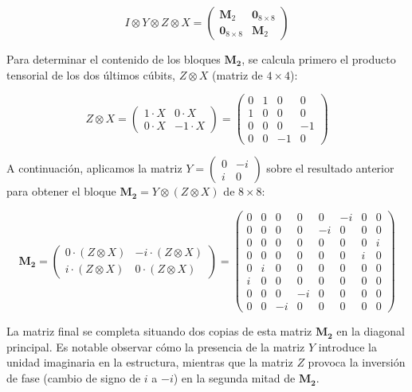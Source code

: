 \documentclass[11pt,a4paper,spanish]{book}
\begin{document}
\[
I \otimes Y \otimes Z \otimes X = 
\begin{pmatrix}
\mathbf{M}_2 & \mathbf{0}_{8 \times 8} \\
\mathbf{0}_{8 \times 8} & \mathbf{M}_2
\end{pmatrix}
\]

Para determinar el contenido de los bloques $\mathbf{M_2}$, se calcula primero el producto tensorial de los dos últimos cúbits, $Z \otimes X$ (matriz de $4 \times 4$):

\[
Z \otimes X = 
\begin{pmatrix} 1 \cdot X & 0 \cdot X \\ 0 \cdot X & -1 \cdot X \end{pmatrix} =
\begin{pmatrix}
0 & 1 & 0 & 0 \\
1 & 0 & 0 & 0 \\
0 & 0 & 0 & -1 \\
0 & 0 & -1 & 0
\end{pmatrix}
\]

A continuación, aplicamos la matriz $Y = \begin{pmatrix} 0 & -i \\ i & 0 \end{pmatrix}$ sobre el resultado anterior para obtener el bloque $\mathbf{M_2} = Y \otimes (Z \otimes X)$ de $8 \times 8$:

\[
\mathbf{M_2} = 
\begin{pmatrix} 
0 \cdot (Z \otimes X) & -i \cdot (Z \otimes X) \\ 
i \cdot (Z \otimes X) & 0 \cdot (Z \otimes X) 
\end{pmatrix} =
\begin{pmatrix}
0 & 0 & 0 & 0 & 0 & -i & 0 & 0 \\
0 & 0 & 0 & 0 & -i & 0 & 0 & 0 \\
0 & 0 & 0 & 0 & 0 & 0 & 0 & i \\
0 & 0 & 0 & 0 & 0 & 0 & i & 0 \\
0 & i & 0 & 0 & 0 & 0 & 0 & 0 \\
i & 0 & 0 & 0 & 0 & 0 & 0 & 0 \\
0 & 0 & 0 & -i & 0 & 0 & 0 & 0 \\
0 & 0 & -i & 0 & 0 & 0 & 0 & 0
\end{pmatrix}
\]

La matriz final se completa situando dos copias de esta matriz $\mathbf{M_2}$ en la diagonal principal. Es notable observar cómo la presencia de la matriz $Y$ introduce la unidad imaginaria en la estructura, mientras que la matriz $Z$ provoca la inversión de fase (cambio de signo de $i$ a $-i$) en la segunda mitad de $\mathbf{M_2}$.
\end{document}
